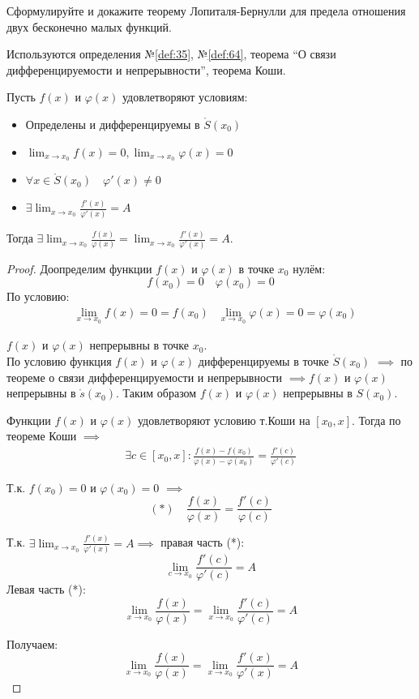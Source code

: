 \begin{question}
    Сформулируйте и докажите теорему Лопиталя-Бернулли для предела отношения двух бесконечно малых функций.
\end{question}
\begin{used}
    Используются определения №\ref{def:35}, №\ref{def:64}, теорема ``О связи дифференцируемости и непрерывности'', теорема Коши.
\end{used}
\begin{theorem}
    Пусть $f(x)$ и  $\varphi(x)$ удовлетворяют условиям:
    \begin{itemize}
        \item Определены и дифференцируемы в $\mathring{S}(x_0)$
        \item $\lim_{x \to x_0} f(x) = 0, \lim_{x \to x_0} \varphi(x) = 0$
        \item $\forall x \in \mathring{S}(x_0) \quad \varphi'(x) \neq 0$
        \item $\exists \lim_{x \to x_0} \frac{f'(x)}{\varphi'(x)} = A$
    \end{itemize}
    Тогда $\exists \lim_{x \to x_0} \frac{f(x)}{\varphi(x)} = \lim_{x \to x_0} \frac{f'(x)}{\varphi'(x)} = A$.
\end{theorem}
\begin{proof}
    Доопределим функции $f(x)$ и $\varphi(x)$ в точке $x_0$ нулём: \[
        f(x_0) = 0 \quad \varphi(x_0) = 0
    \] 
    По условию:
    \begin{align*}
        &\lim_{x \to x_0} f(x) = 0 = f(x_0)
        &\lim_{x \to x_0} \varphi(x) = 0 = \varphi(x_0)
    \end{align*}
  
    $f(x)$ и  $\varphi(x)$ непрерывны в точке $x_0$.\\
    По условию функция $f(x)$ и  $\varphi(x)$ дифференцируемы в точке $\mathring{S}(x_0)$ $\implies$ по теореме о связи дифференцируемости и непрерывности $\implies f(x)$ и $\varphi(x)$ непрерывны в $\mathring{s}(x_0)$. Таким образом $f(x)$ и  $\varphi(x)$ непрерывны в $S(x_0)$.

    Функции $f(x)$ и  $\varphi(x)$ удовлетворяют условию т.Коши на $[x_0, x]$. Тогда по теореме Коши $\implies$ 
    \begin{gather*}
        \exists c \in [x_0, x] : \frac{f(x) - f(x_0)}{\varphi(x) - \varphi(x_0)} = \frac{f'(c)}{\varphi'(c)} \tag{*} 
    \end{gather*}

    Т.к. $f(x_0) = 0$ и $\varphi(x_0) = 0$ $\implies$ \[
        (*) \quad \boxed{\frac{f(x)}{\varphi(x)} = \frac{f'(c)}{\varphi(c)}}
    \] 

    Т.к. $\exists \lim_{x \to x_0} \frac{f'(x)}{\varphi'(x)} = A \implies$ правая часть (*): \[
        \lim_{c \to x_0} \frac{f'(c)}{\varphi'(c)} = A
    \] 
    Левая часть (*): \[
        \lim_{x \to x_0} \frac{f(x)}{\varphi(x)} = \lim_{x \to x_0} \frac{f'(c)}{\varphi'(c)} = A
    \] 

    Получаем: \[
        \lim_{x \to x_0} \frac{f(x)}{\varphi(x)} = \lim_{x \to x_0} \frac{f'(x)}{\varphi'(x)} = A
    \] 
\end{proof}
\pagebreak



